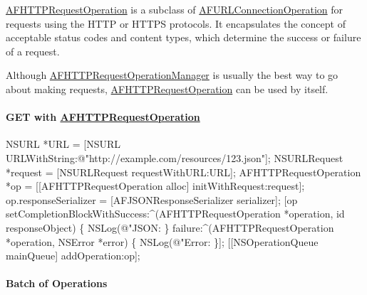 {\ttfamily \mbox{\hyperlink{interface_a_f_h_t_t_p_request_operation}{A\+F\+H\+T\+T\+P\+Request\+Operation}}} is a subclass of {\ttfamily \mbox{\hyperlink{interface_a_f_u_r_l_connection_operation}{A\+F\+U\+R\+L\+Connection\+Operation}}} for requests using the H\+T\+TP or H\+T\+T\+PS protocols. It encapsulates the concept of acceptable status codes and content types, which determine the success or failure of a request.

Although {\ttfamily \mbox{\hyperlink{interface_a_f_h_t_t_p_request_operation_manager}{A\+F\+H\+T\+T\+P\+Request\+Operation\+Manager}}} is usually the best way to go about making requests, {\ttfamily \mbox{\hyperlink{interface_a_f_h_t_t_p_request_operation}{A\+F\+H\+T\+T\+P\+Request\+Operation}}} can be used by itself.

\paragraph*{{\ttfamily G\+ET} with {\ttfamily \mbox{\hyperlink{interface_a_f_h_t_t_p_request_operation}{A\+F\+H\+T\+T\+P\+Request\+Operation}}}}


\begin{DoxyCode}
NSURL *URL = [NSURL URLWithString:@"http://example.com/resources/123.json"];
NSURLRequest *request = [NSURLRequest requestWithURL:URL];
AFHTTPRequestOperation *op = [[AFHTTPRequestOperation alloc] initWithRequest:request];
op.responseSerializer = [AFJSONResponseSerializer serializer];
[op setCompletionBlockWithSuccess:^(AFHTTPRequestOperation *operation, id responseObject) \{
    NSLog(@"JSON: %
\} failure:^(AFHTTPRequestOperation *operation, NSError *error) \{
    NSLog(@"Error: %
\}];
[[NSOperationQueue mainQueue] addOperation:op];
\end{DoxyCode}


\paragraph*{Batch of Operations}


